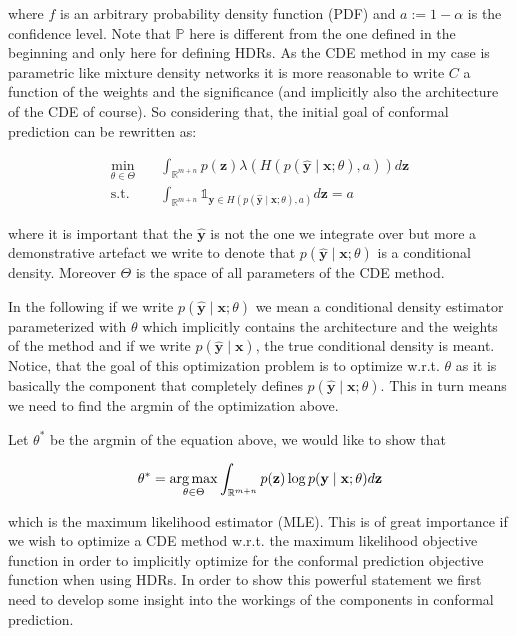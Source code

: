 where $f$ is an arbitrary probability density function (PDF) and $a := 1 - \alpha$ is the confidence level. Note that $\mathbb{P}$ here is different from the one defined in the beginning and only here for defining HDRs. As the CDE method in my case is parametric like mixture density networks it is more reasonable to write $C$ a function of the weights and the significance (and implicitly also the architecture of the CDE of course). So considering that, the initial goal of conformal prediction can be rewritten as:

\begin{align}
    \min_{\theta \in \Theta} \quad & \int_{\mathbb{R}^{m + n}} p(\mathbf{z})
    \lambda(H(p(\mathbf{\hat{y}} \mid \mathbf{x}; \theta), a))
    d\mathbf{z}
    \\
    \text{s.t.} \quad            & \int_{\mathbb{R}^{m + n}}
    \mathds{1}_{\mathbf{y} \in
    H(p(\mathbf{\hat{y}} \mid \mathbf{x}; \theta), a)} d\mathbf{z} = a
\end{align}

where it is important that the $\mathbf{\hat{y}}$ is not the one we integrate over but more a demonstrative artefact we write to denote that $p(\mathbf{\hat{y}} \mid \mathbf{x}; \theta)$ is a conditional density. Moreover $\Theta$ is the space of all parameters of the CDE method.

In the following if we write $p(\mathbf{\hat{y}} \mid \mathbf{x}; \theta)$ we mean a conditional density estimator parameterized with $\theta$ which implicitly contains the architecture and the weights of the method and if we write $p(\mathbf{\hat{y}} \mid \mathbf{x})$, the true conditional density is meant. Notice, that the goal of this optimization problem is to optimize w.r.t. $\theta$ as it is basically the component that completely defines $p(\mathbf{\hat{y}} \mid \mathbf{x}; \theta)$. This in turn means we need to find the argmin of the
optimization above.

Let $\theta^*$ be the argmin of the equation above, we would like to show that

\begin{equation}
    \theta^* = \operatorname*{arg\,max}_{\theta \in \Theta}  \int_{\mathbb{R}^{m + n}}
    p(\mathbf{z}) \log p(\mathbf{y} \mid \mathbf{x}; \theta) d
    \mathbf{z}
\end{equation}

which is the maximum likelihood estimator (MLE). This is of great importance if we wish to optimize a CDE method w.r.t. the maximum likelihood objective function in order to implicitly optimize for the conformal prediction objective function when using HDRs. In order to show this powerful statement we first need to develop some insight into the workings of the components in conformal prediction.


